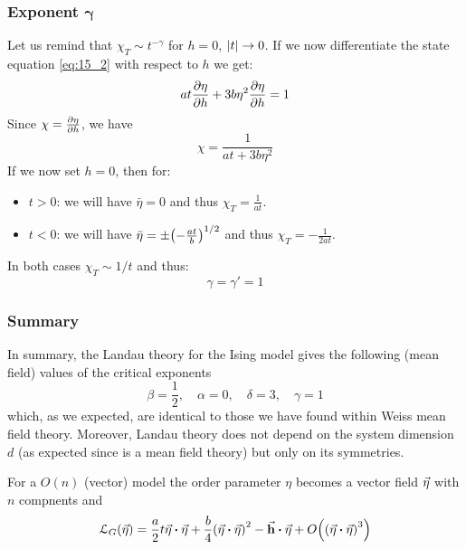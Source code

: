 \documentclass[../main/main.tex]{subfiles}
\begin{document}
\subsubsection{Exponent \( \pmb{\gamma}   \)}
Let us remind that \( \chi _T \sim t^{- \gamma  } \) for \( h=0 \), \( \abs{t} \rightarrow 0  \).
If we now differentiate the state equation \eqref{eq:15_2} with respect to \( h \) we get:
\begin{equation*}
  a t \pdv{\eta }{h} + 3 b \eta ^2 \pdv{\eta }{h} = 1
\end{equation*}
Since \( \chi = \pdv{\eta }{h} \), we have
\begin{equation*}
  \chi = \frac{1}{at+3 b \eta ^2}
\end{equation*}
If we now set \( h=0 \), then for:
\begin{itemize}
\item \( t>0 \): we will have \( \bar{\eta } = 0  \) and thus \( \chi _T =  \frac{1}{at} \).
\item \( t<0 \): we will have \( \bar{\eta } = \pm \qty(- \frac{at}{b})^{1/2}   \) and thus \( \chi _T = - \frac{1}{2at} \).
\end{itemize}
In both cases \( \chi _T \sim  1/t \) and thus:
\begin{equation*}
  \gamma = \gamma' = 1
\end{equation*}

\subsubsection{Summary}
In summary, the Landau theory for the Ising model gives the following (mean field) values of the critical exponents
\begin{equation}
  \beta = \frac{1}{2}, \quad \alpha =0, \quad \delta =3, \quad \gamma =1
\end{equation}
which, as we expected, are identical to those we have found within Weiss mean field theory. Moreover, Landau theory does not depend on the system dimension \( d \) (as expected since is a mean field theory) but only on its symmetries.

\begin{remark}
For a \( O(n) \) (vector) model the order parameter \( \eta  \) becomes a vector field \( \va{\eta } \) with \( n \) compnents and
\begin{equation}
  \mathcal{L}_G ( \va{\eta }) = \frac{a}{2} t \va{\eta } \vdot \va{\eta } + \frac{b}{4} \qty(\va{\eta } \vdot \va{\eta } )^2 - \va{h} \vdot \va{\eta } + O \qty(\qty(\va{\eta } \vdot \va{\eta })^3 )
\end{equation}
\end{remark}
\end{document}

